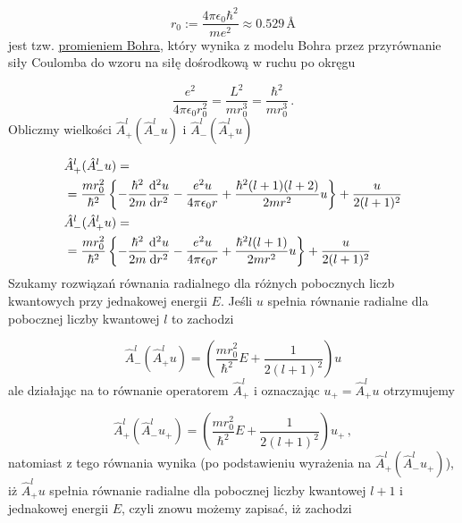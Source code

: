 \documentclass{myclass}
\begin{document}
\begin{equation*}
r_0:=\frac{4\pi\epsilon_0\hbar^2}{me^2}\approx0.529\,\text{Å}
\end{equation*}
jest tzw. \underline{promieniem Bohra}, który wynika z modelu Bohra przez przyrównanie siły Coulomba
do wzoru na siłę dośrodkową w ruchu po okręgu

\begin{equation*}
\frac{e^2}{4\pi\epsilon_0r_0^2}=\frac{L^2}{mr_0^3}=\frac{\hbar^2}{mr_0^3}\,.
\end{equation*}
Obliczmy wielkości \(\hat{A}^l_+(\hat{A}^l_-u)\) i \(\hat{A}^l_-(\hat{A}^l_+u)\)

\begin{equation*}
\begin{split}
    &\hat{A}^l_+(\hat{A}^l_-u)=\\
    &=\frac{mr_0^2}{\hbar^2}\left\{-\frac{\hbar^2}{2m}\dv[2]{u}{r}-\frac{e^2u}{4\pi\epsilon_0r}+\frac{\hbar^2(l+1)(l+2)}{2mr^2}u\right\}+\frac{u}{2(l+1)^2}\\
    &\hat{A}^l_-(\hat{A}^l_+u)=\\
    &=\frac{mr_0^2}{\hbar^2}\left\{-\frac{\hbar^2}{2m}\dv[2]{u}{r}-\frac{e^2u}{4\pi\epsilon_0r}+\frac{\hbar^2l(l+1)}{2mr^2}u\right\}+\frac{u}{2(l+1)^2}
\end{split}
\end{equation*}
Szukamy rozwiązań równania radialnego dla różnych pobocznych liczb kwantowych przy jednakowej
energii \(E\). Jeśli \(u\) spełnia równanie radialne dla pobocznej liczby kwantowej \(l\) to
zachodzi

\begin{equation*}
\hat{A}^l_-(\hat{A}^l_+u)=\left(\frac{mr_0^2}{\hbar^2}E+\frac{1}{2(l+1)^2}\right)u
\end{equation*}
ale działając na to równanie operatorem \(\hat{A}_+^l\) i oznaczając \(u_+=\hat{A}_+^lu\)
otrzymujemy

\begin{equation*}
\hat{A}_+^l(\hat{A}_-^lu_+)=\left(\frac{mr_0^2}{\hbar^2}E+\frac{1}{2(l+1)^2}\right)u_+\,,
\end{equation*}
natomiast z tego równania wynika (po podstawieniu wyrażenia na \(\hat{A}_+^l(\hat{A}_-^lu_+)\)), iż
\(\hat{A}_+^lu\) spełnia równanie radialne dla pobocznej liczby kwantowej \(l+1\) i jednakowej
energii \(E\), czyli znowu możemy zapisać, iż zachodzi
\end{document}
